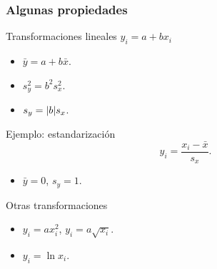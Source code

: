 \documentclass[table]{beamer}
\begin{document}
\begin{frame}
    \frametitle{Algunas propiedades}
    \begin{block}{Transformaciones lineales $y_{i} = a + b x_{i}$}
        \begin{itemize}
            \item $\bar{y} = a + b \bar{x}$.
            \item $s^{2}_{y} = b^{2} s^{2}_{x}$.
            \item $s_{y} = \vparens{b} s_{x}$.
        \end{itemize}
    \end{block}
    \begin{exampleblock}{Ejemplo: estandarización}
        \begin{equation*}
            y_{i} = \frac{x_{i} - \bar{x}}{s_{x}} .
        \end{equation*}
        \begin{itemize}
            \item $\bar{y} = 0$, $s_{y} = 1$.
        \end{itemize}
    \end{exampleblock}
    \begin{alertblock}{Otras transformaciones}
        \begin{itemize}
            \item $y_{i} = a x_{i}^{2}$, $y_{i} = a \sqrt{x_{i}}$.
            \item $y_{i} = \ln x_{i}$.
        \end{itemize}
    \end{alertblock}
\end{frame}
\end{document}
